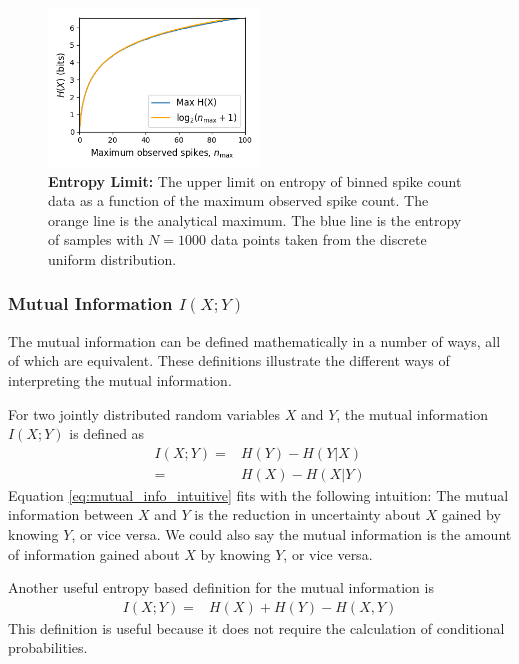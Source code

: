 \documentclass[a4paper,12pt]{article}
\theoremstyle{definition}
\begin{document}
        \begin{figure}[h]
          \centering
          \includegraphics[width=0.5\textwidth]{figures/entropy_limit.png}
          \caption{\textbf{Entropy Limit:} The upper limit on entropy of binned spike count data as a function of the maximum observed spike count. The orange line is the analytical maximum. The blue line is the entropy of samples with $N=1000$ data points taken from the discrete uniform distribution.}
          \label{fig:entropy_limit}
        \end{figure}

        \subsubsection{Mutual Information $I(X;Y)$}
        The mutual information can be defined mathematically in a number of ways, all of which are equivalent. These definitions illustrate the different ways of interpreting the mutual information.

        For two jointly distributed random variables $X$ and $Y$, the mutual information $I(X;Y)$ is defined as
        \begin{align}\label{eq:mutual_info_intuitive}
            I(X;Y)  =& H(Y) - H(Y|X) \\
                    =& H(X) - H(X|Y)
        \end{align}
        Equation \ref{eq:mutual_info_intuitive} fits with the following intuition: The mutual information between $X$ and $Y$ is the reduction in uncertainty about $X$ gained by knowing $Y$, or vice versa. We could also say the mutual information is the amount of information gained about $X$ by knowing $Y$, or vice versa.

        Another useful entropy based definition for the mutual information is
        \begin{align}\label{eq:mutual_info_useful}
            I(X;Y)  =& H(X) + H(Y) - H(X,Y)
        \end{align}
        This definition is useful because it does not require the calculation of conditional probabilities.
\end{document}
